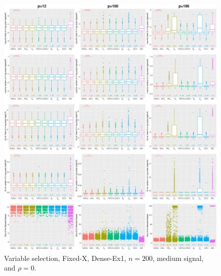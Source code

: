 \begin{figure}[!ht]
\centering
\includegraphics[width=\textwidth]{figures/supplement/fixedx/subset_selection/Dense-Ex1_n200_msnr_rho0.eps}
\caption{Variable selection, Fixed-X, Dense-Ex1, $n=200$, medium signal, and $\rho=0$.}
\end{figure}
\clearpage

